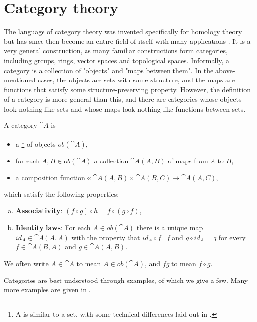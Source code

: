 \section{Category theory}\label{sec-category-theory}
The language of category theory was invented specifically for homology theory but has since then become an entire field of itself with many applications \cite{Marquis}. It is a very general construction, as many familiar constructions form categories, including groups, rings, vector spaces and topological spaces. Informally, a category is a collection of "objects" and "maps between them". In the above-mentioned cases, the objects are sets with some structure, and the maps are functions that satisfy some structure-preserving property. However, the definition of a category is more general than this, and there are categories whose objects look nothing like sets and whose maps look nothing like functions between sets.

\begin{definition}
A category $\cat{A}$ is
\begin{itemize}
    \item a \footnote{A  is similar to a set, with some technical differences laid out in \cite{Leinster}.} of objects $ob(\cat{A})$,
    \item for each $A,B\in ob(\cat{A})$ a collection $\cat{A}(A,B)$ of maps from $A$ to $B$,
    \item a composition function $\circ:\cat{A}(A,B)\times \cat{A}(B,C)\rightarrow \cat{A}(A,C)$,
\end{itemize}
which satisfy the following properties:

\begin{enumerate}[(a)]
\item \textbf{Associativity}: $(f\circ g)\circ h=f\circ(g\circ f)$,
\item \textbf{Identity laws}: For each $A\in ob(\cat{A})$ there is a unique map $id_A\in \cat{A}(A,A)$ with the property that $id_A\circ f$=$f$ and $g\circ id_A=g$ for every $f\in \cat{A}(B,A)$ and $g\in \cat{A}(A,B)$.
\end{enumerate}
\end{definition}
We often write $A\in \cat{A}$ to mean $A\in ob(\cat{A})$, and $fg$ to mean $f\circ g$.
\par Categories are best understood through examples, of which we give a few. Many more examples are given in \cite{Leinster}.


